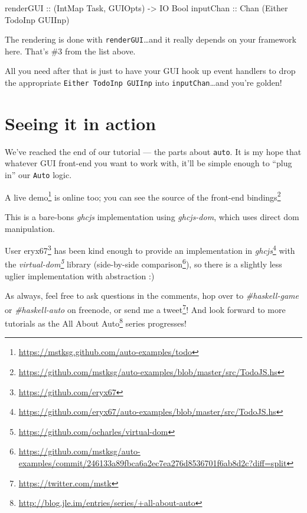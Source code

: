 \documentclass[]{article}
\newenvironment{Shaded}{}{}
\newcommand{\DataTypeTok}[1]{\textcolor[rgb]{0.56,0.13,0.00}{#1}}
\newcommand{\NormalTok}[1]{#1}
\newcommand{\OtherTok}[1]{\textcolor[rgb]{0.00,0.44,0.13}{#1}}
\renewcommand{\href}[2]{#2\footnote{\url{#1}}}
\begin{document}
\begin{Shaded}
\begin{Highlighting}[]
\OtherTok{renderGUI ::}\NormalTok{ (}\DataTypeTok{IntMap} \DataTypeTok{Task}\NormalTok{, }\DataTypeTok{GUIOpts}\NormalTok{) }\OtherTok{{-}\textgreater{}} \DataTypeTok{IO} \DataTypeTok{Bool}
\OtherTok{inputChan ::} \DataTypeTok{Chan}\NormalTok{ (}\DataTypeTok{Either} \DataTypeTok{TodoInp} \DataTypeTok{GUIInp}\NormalTok{)}
\end{Highlighting}
\end{Shaded}

The rendering is done with \texttt{renderGUI}\ldots and it really depends on
your framework here. That's \#3 from the list above.

All you need after that is just to have your GUI hook up event handlers to drop
the appropriate \texttt{Either\ TodoInp\ GUIInp} into
\texttt{inputChan}\ldots and you're golden!

\section{Seeing it in action}\label{seeing-it-in-action}

We've reached the end of our tutorial --- the parts about \texttt{auto}. It is
my hope that whatever GUI front-end you want to work with, it'll be simple
enough to ``plug in'' our \texttt{Auto} logic.

A \href{https://mstksg.github.com/auto-examples/todo}{live demo} is online too;
you can see
\href{https://github.com/mstksg/auto-examples/blob/master/src/TodoJS.hs}{the
source of the front-end bindings}

This is a bare-bons \emph{ghcjs} implementation using \emph{ghcjs-dom}, which
uses direct dom manipulation.

User \href{https://github.com/eryx67}{eryx67} has been kind enough to provide
\href{https://github.com/eryx67/auto-examples/blob/master/src/TodoJS.hs}{an
implementation in \emph{ghcjs}} with the
\emph{\href{https://github.com/ocharles/virtual-dom}{virtual-dom}} library
(\href{https://github.com/mstksg/auto-examples/commit/246133a89fbca6a2ec7ea276d8536701f6ab8d2c?diff=split}{side-by-side
comparison}), so there is a slightly less uglier implementation with abstraction
:)

As always, feel free to ask questions in the comments, hop over to
\emph{\#haskell-game} or \emph{\#haskell-auto} on freenode, or send me a
\href{https://twitter.com/mstk}{tweet}! And look forward to more tutorials as
the \href{http://blog.jle.im/entries/series/+all-about-auto}{All About Auto}
series progresses!
\end{document}
